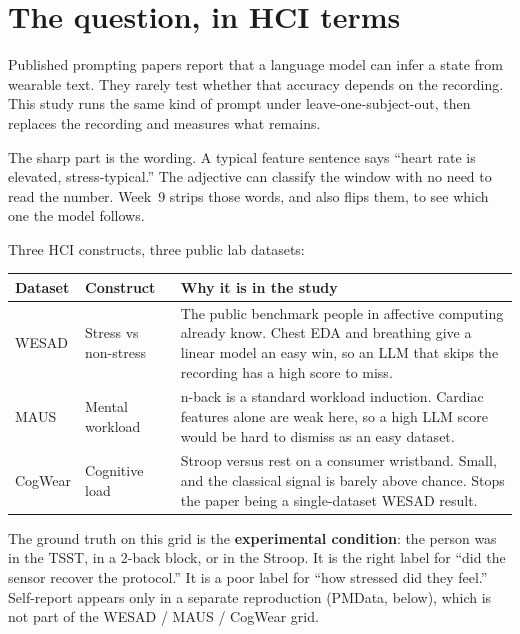 \documentclass[11pt]{article}
\begin{document}
\section{The question, in HCI terms}

Published prompting papers report that a language model can infer a state from wearable text. They rarely test whether that accuracy depends on the recording. This study runs the same kind of prompt under leave-one-subject-out, then replaces the recording and measures what remains.

The sharp part is the wording. A typical feature sentence says ``heart rate is elevated, stress-typical.'' The adjective can classify the window with no need to read the number. Week~9 strips those words, and also flips them, to see which one the model follows.

Three HCI constructs, three public lab datasets:

\begin{center}
{\small
\begin{tabularx}{\textwidth}{@{}L{2.15cm}L{3.5cm}Y@{}}
\textbf{Dataset} & \textbf{Construct} & \textbf{Why it is in the study} \\
\midrule
WESAD & Stress vs non-stress & The public benchmark people in affective computing already know. Chest EDA and breathing give a linear model an easy win, so an LLM that skips the recording has a high score to miss. \\
\addlinespace
MAUS & Mental workload & n-back is a standard workload induction. Cardiac features alone are weak here, so a high LLM score would be hard to dismiss as an easy dataset. \\
\addlinespace
CogWear & Cognitive load & Stroop versus rest on a consumer wristband. Small, and the classical signal is barely above chance. Stops the paper being a single-dataset WESAD result. \\
\bottomrule
\end{tabularx}
}
\end{center}

The ground truth on this grid is the \textbf{experimental condition}: the person was in the TSST, in a 2-back block, or in the Stroop. It is the right label for ``did the sensor recover the protocol.'' It is a poor label for ``how stressed did they feel.'' Self-report appears only in a separate reproduction (PMData, below), which is not part of the WESAD / MAUS / CogWear grid.
\end{document}
